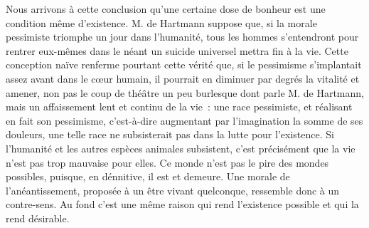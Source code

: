\documentclass[french,twoside]{book} %
\begin{document}
Nous arrivons à cette conclusion qu’une certaine dose de bonheur est une condition même d’existence. M. de Hartmann suppose que, si la morale pessimiste triomphe un jour dans l’humanité, tous les hommes s’entendront pour rentrer eux-mêmes dans le néant un suicide universel mettra fin à la vie. Cette conception naïve renferme pourtant cette vérité que, si le pessimisme s’implantait assez avant dans le cœur humain, il pourrait en diminuer par degrés la vitalité et amener, non pas le coup de théâtre un peu burlesque dont parle M. de Hartmann, mais un affaissement lent et continu de la vie : une race pessimiste, et réalisant en fait son pessimisme, c’est-à-dire augmentant par l’imagination la somme de ses douleurs, une telle race ne subsisterait pas dans la lutte pour l’existence. Si l’humanité et les autres espèces animales subsistent, c’est précisément que la vie n’est pas trop mauvaise pour elles. Ce monde n’est pas le pire des mondes possibles, puisque, en dénnitive, il est et demeure. Une morale de l’anéantissement, proposée à un être vivant quelconque, ressemble donc à un contre-sens. Au fond c’est une même raison qui rend l’existence possible et qui la rend désirable.
\end{document}
